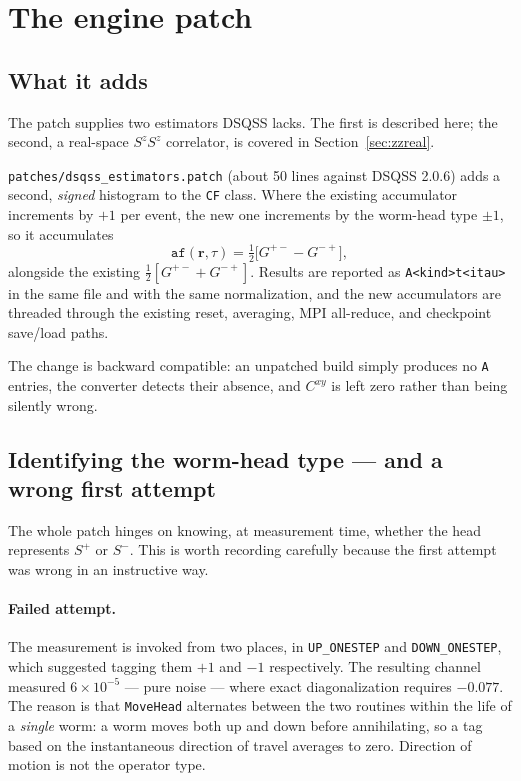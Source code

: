 \documentclass[11pt,a4paper]{article}
\newcommand{\Sp}{S^{+}}
\newcommand{\Sm}{S^{-}}
\newcommand{\Gpm}{G^{+-}}
\newcommand{\Gmp}{G^{-+}}
\newcommand{\code}[1]{\texttt{#1}}
\begin{document}
\section{The engine patch}
\label{sec:patch}

\subsection{What it adds}

The patch supplies two estimators DSQSS lacks. The first is described here; the
second, a real-space $S^zS^z$ correlator, is covered in
Section~\ref{sec:zzreal}.

\code{patches/dsqss\_estimators.patch} (about 50 lines against DSQSS 2.0.6) adds
a second, \emph{signed} histogram to the \code{CF} class. Where the existing
accumulator increments by $+1$ per event, the new one increments by the worm-head
type $\pm1$, so it accumulates
\begin{equation}
  \code{af}(\mathbf{r},\tau) = \tfrac12\bigl[\Gpm - \Gmp\bigr],
\end{equation}
alongside the existing $\tfrac12[\Gpm+\Gmp]$. Results are reported as
\code{A<kind>t<itau>} in the same file and with the same normalization, and the
new accumulators are threaded through the existing reset, averaging, MPI
all-reduce, and checkpoint save/load paths.

The change is backward compatible: an unpatched build simply produces no
\code{A} entries, the converter detects their absence, and $C^{xy}$ is left
zero rather than being silently wrong.

\subsection{Identifying the worm-head type --- and a wrong first attempt}

The whole patch hinges on knowing, at measurement time, whether the head
represents $\Sp$ or $\Sm$. This is worth recording carefully because the
first attempt was wrong in an instructive way.

\paragraph{Failed attempt.} The measurement is invoked from two places, in
\code{UP\_ONESTEP} and \code{DOWN\_ONESTEP}, which suggested tagging them $+1$
and $-1$ respectively. The resulting channel measured
$6\times10^{-5}$ --- pure noise --- where exact diagonalization requires
$-0.077$. The reason is that \code{MoveHead} alternates between the two
routines within the life of a \emph{single} worm: a worm moves both up and down
before annihilating, so a tag based on the instantaneous direction of travel
averages to zero. Direction of motion is not the operator type.
\end{document}
